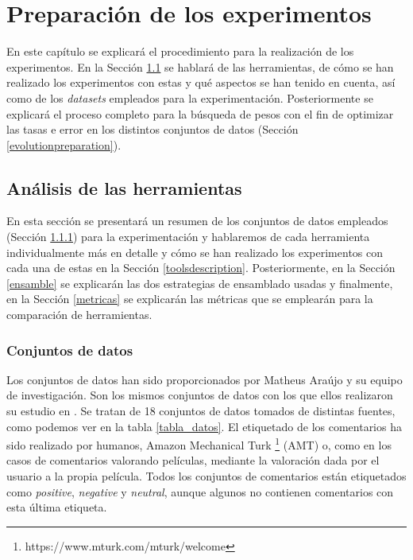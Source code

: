 \chapter{Preparación de los experimentos} \label{preparacionexperimentos}
En este capítulo se explicará el procedimiento para la realización de los experimentos. En la Sección \ref{toolsanalysis} se hablará de las herramientas, de cómo se han realizado los experimentos con estas y qué aspectos se han tenido en cuenta, así como de los \textit{datasets} empleados para la experimentación. Posteriormente se explicará el proceso completo para la búsqueda de pesos con el fin de optimizar las tasas e error en los distintos conjuntos de datos (Sección \ref{evolutionpreparation}).

\section{Análisis de las herramientas} \label{toolsanalysis}
En esta sección se presentará un resumen de los conjuntos de datos empleados (Sección \ref{datasets}) para la experimentación y hablaremos de cada herramienta individualmente más en detalle y cómo se han realizado los experimentos con cada una de estas en la Sección \ref{toolsdescription}. Posteriormente, en la Sección \ref{ensamble} se explicarán las dos estrategias de ensamblado usadas y finalmente, en la Sección \ref{metricas} se explicarán las métricas que se emplearán para la comparación de herramientas.

\subsection{Conjuntos de datos} \label{datasets}
Los conjuntos de datos han sido proporcionados por Matheus Araújo y su equipo de investigación. Son los mismos conjuntos de datos con los que ellos realizaron su estudio en \cite{rib}. Se tratan de 18 conjuntos de datos tomados de distintas fuentes, como podemos ver en la tabla \ref{tabla_datos}. El etiquetado de los comentarios ha sido realizado por humanos, Amazon Mechanical Turk \footnote{https://www.mturk.com/mturk/welcome} (AMT) o, como en los casos de comentarios valorando películas, mediante la valoración dada por el usuario a la propia película. Todos los conjuntos de comentarios están etiquetados como \textit{positive}, \textit{negative} y \textit{neutral}, aunque algunos no contienen comentarios con esta última etiqueta.

